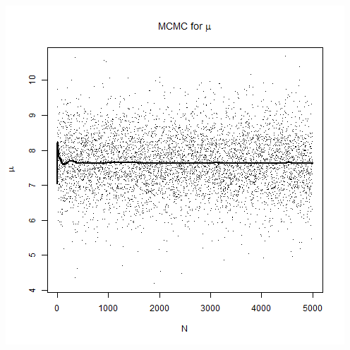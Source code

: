 \documentclass{article}
\begin{document}
\begin{enumerate}[8.1]
\begin{enumerate}[(a)]
\includegraphics[scale = 0.3]{mu-b.png}\\


\end{enumerate}
\end{enumerate}
\end{document}
